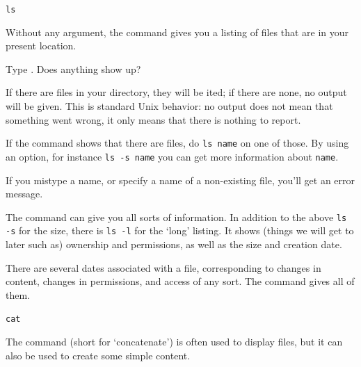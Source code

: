  {\texttt{ls}}

Without any argument, the  command gives you a
listing of files that are in your present location.

\begin{exercise}
  Type . Does anything show up?
\end{exercise}
\begin{outcome}
  If there are files in your directory, they will be ited;
  if there are none, no output will be given. This is standard Unix
  behavior: no output does not mean that something went wrong, it
  only means that there is nothing to report.
\end{outcome}

\begin{exercise}
  If the  command shows that there are files, do
  \lstinline{ls name} on one of those.
  By using an option, for instance \lstinline{ls -s name}
  you can get more information about \lstinline{name}.
\end{exercise}

\begin{caution}
  If you mistype a name, or specify a name of a
  non-existing file, you'll get an error message.
\end{caution}

The  command can give you all sorts of information.
In addition to the above \lstinline{ls -s} for the size, there is
\lstinline{ls -l} for the `long' listing.
It shows (things we will get to later such as) ownership and permissions,
as well as the size and creation date.

\begin{remark}
  There are several dates associated with a file, corresponding to
  changes in content, changes in permissions, and access of any
  sort. The  command gives all of them.
\end{remark}

 {\texttt{cat}}

The  command (short for `concatenate')
is often used to display files, but it can also be
used to create some simple content. 

